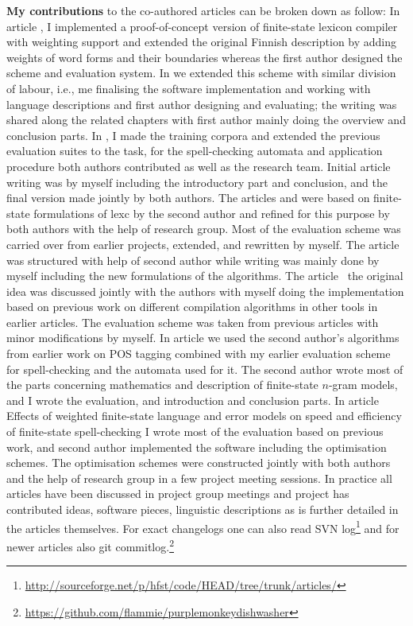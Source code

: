 \documentclass[officiallayout,final]{unihelcompling}
\begin{document}
\textbf{My contributions} to the co-authored articles can be broken down as
follow: In article , I implemented a
proof-of-concept version of finite-state lexicon compiler with weighting
support and extended the original Finnish description by adding weights of
word forms and their boundaries whereas the first author designed the scheme
and evaluation system. In  we extended this
scheme with similar division of labour, i.e., me finalising the software
implementation and working with language descriptions and first author
designing and evaluating; the writing was shared along the related chapters
with first author mainly doing the overview and conclusion parts. In
, I made the training corpora and extended
the previous evaluation suites to the task, for the spell-checking automata and
application procedure both authors contributed as well as the research team.
Initial article writing was by myself including the introductory part and
conclusion, and the final version made jointly by both authors. The articles
 and  were
based on finite-state formulations of lexc by the second author and refined for
this purpose by both authors with the help of research group. Most of the
evaluation scheme was carried over from earlier projects, extended, and
rewritten by myself. The article was structured with help of second author
while writing was mainly done by myself including the new formulations of the
algorithms. The article~ the original idea was
discussed jointly with the authors with myself doing the implementation based
on previous work on different compilation algorithms in other tools in earlier
articles.  The evaluation scheme was taken from previous articles with minor
modifications by myself. In article  we used
the second author's algorithms from earlier work on POS tagging combined with
my earlier evaluation scheme for spell-checking and the automata used for it.
The second author wrote most of the parts concerning mathematics and
description of finite-state \(n\)-gram models, and I wrote the evaluation, and
introduction and conclusion parts. In article 
Effects of weighted finite-state language and error models on speed and
efficiency of finite-state spell-checking I wrote most of the evaluation based
on previous work, and second author implemented the software including the
optimisation schemes. The optimisation schemes were constructed jointly with
both authors and the help of research group in a few project meeting sessions.
In practice all articles have been discussed in project group meetings and
project has contributed ideas, software pieces, linguistic descriptions as is
further detailed in the articles themselves. For exact changelogs one can also
read SVN
log\footnote{\url{http://sourceforge.net/p/hfst/code/HEAD/tree/trunk/articles/}}
and for newer articles also git
commitlog.\footnote{\url{https://github.com/flammie/purplemonkeydishwasher}}
\end{document}
